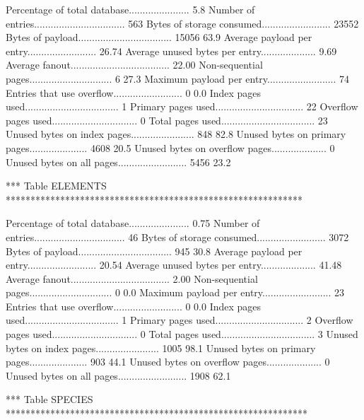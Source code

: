 Percentage of total database......................   5.8%
Number of entries................................. 563       
Bytes of storage consumed......................... 23552     
Bytes of payload.................................. 15056       63.9%
Average payload per entry......................... 26.74     
Average unused bytes per entry.................... 9.69      
Average fanout.................................... 22.00     
Non-sequential pages.............................. 6           27.3%
Maximum payload per entry......................... 74        
Entries that use overflow......................... 0            0.0%
Index pages used.................................. 1         
Primary pages used................................ 22        
Overflow pages used............................... 0         
Total pages used.................................. 23        
Unused bytes on index pages....................... 848         82.8%
Unused bytes on primary pages..................... 4608        20.5%
Unused bytes on overflow pages.................... 0         
Unused bytes on all pages......................... 5456        23.2%

*** Table ELEMENTS ************************************************************

Percentage of total database......................   0.75%
Number of entries................................. 46        
Bytes of storage consumed......................... 3072      
Bytes of payload.................................. 945         30.8%
Average payload per entry......................... 20.54     
Average unused bytes per entry.................... 41.48     
Average fanout.................................... 2.00      
Non-sequential pages.............................. 0            0.0%
Maximum payload per entry......................... 23        
Entries that use overflow......................... 0            0.0%
Index pages used.................................. 1         
Primary pages used................................ 2         
Overflow pages used............................... 0         
Total pages used.................................. 3         
Unused bytes on index pages....................... 1005        98.1%
Unused bytes on primary pages..................... 903         44.1%
Unused bytes on overflow pages.................... 0         
Unused bytes on all pages......................... 1908        62.1%

*** Table SPECIES *************************************************************

